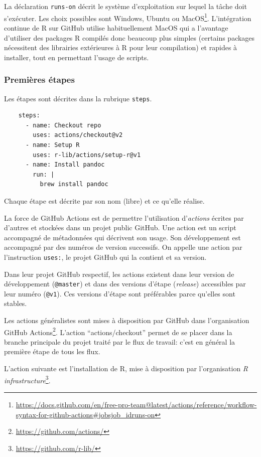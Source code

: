 \documentclass[
  12pt,
  french,
  a4paper,
  extrafontsizes,onecolumn,openright
  ]{memoir}
\begin{document}
La déclaration \texttt{runs-on} décrit le système d'exploitation sur lequel la tâche doit s'exécuter.
Les choix possibles sont Windows, Ubuntu ou MacOS\footnote{\url{https://docs.github.com/en/free-pro-team@latest/actions/reference/workflow-syntax-for-github-actions\#jobsjob_idruns-on}}.
L'intégration continue de R sur GitHub utilise habituellement MacOS qui a l'avantage d'utiliser des packages R compilés donc beaucoup plus simples (certains packages nécessitent des librairies extérieures à R pour leur compilation) et rapides à installer, tout en permettant l'usage de scripts.

\hypertarget{premiuxe8res-uxe9tapes}{%
\subsubsection{Premières étapes}\label{premiuxe8res-uxe9tapes}}

Les étapes sont décrites dans la rubrique \texttt{steps}.

\begin{verbatim}
    steps:
      - name: Checkout repo
        uses: actions/checkout@v2
      - name: Setup R
        uses: r-lib/actions/setup-r@v1
      - name: Install pandoc
        run: |
          brew install pandoc
\end{verbatim}

Chaque étape est décrite par son nom (libre) et ce qu'elle réalise.

La force de GitHub Actions est de permettre l'utilisation d'\emph{actions} écrites par d'autres et stockées dans un projet public GitHub.
Une action est un script accompagné de métadonnées qui décrivent son usage.
Son développement est accompagné par des numéros de version successifs.
On appelle une action par l'instruction \texttt{uses:}, le projet GitHub qui la contient et sa version.

Dans leur projet GitHub respectif, les actions existent dans leur version de développement (\texttt{@master}) et dans des versions d'étape (\emph{release}) accessibles par leur numéro (\texttt{@v1}).
Ces versions d'étape sont préférables parce qu'elles sont stables.

Les actions généralistes sont mises à disposition par GitHub dans l'organisation GitHub Actions\footnote{\url{https://github.com/actions/}}.
L'action \enquote{actions/checkout} permet de se placer dans la branche principale du projet traité par le flux de travail: c'est en général la première étape de tous les flux.

L'action suivante est l'installation de R, mise à disposition par l'organisation \emph{R infrastructure}\footnote{\url{https://github.com/r-lib/}}.
\end{document}
